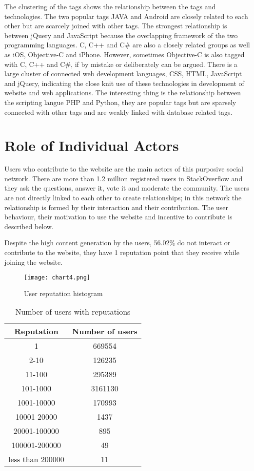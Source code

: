The clustering of the tags shows the relationship between the tags and technologies. The two popular tags JAVA and Android are closely related to each other but are scarcely joined with other tags. The strongest relationship is between jQuery and JavaScript because the overlapping framework of the two programming languages. C, C++ and C\# are also a closely related groups as well as iOS, Objective-C and iPhone. However, sometimes Objective-C is also tagged with C, C++ and C\#, if by mistake or deliberately can be argued.
There is a large cluster of connected web development languages, CSS, HTML, JavaScript and jQuery, indicating the close knit use of these technologies in development of website and web applications. The interesting thing is the relationship between the scripting langue PHP and Python, they are popular tags but are sparsely connected with other tags and are weakly linked with database related tags.


\section{Role of Individual Actors}

Users who contribute to the website are the main actors of this purposive social network. There are more than 1.2 million registered users in StackOverflow and they ask the questions, answer it, vote it and moderate the community. The users are not directly linked to each other to create relationships; in this network the relationship is formed by their interaction and their contribution. The user behaviour, their motivation to use the website and incentive to contribute is described below.

Despite the high content generation by the users, 56.02\% do not interact or contribute to the website, they have 1 reputation point that they receive while joining the website.

\begin{figure}[!htb]
  \centering
  \texttt{[image: chart4.png]}
  \caption{User reputation histogram}
  \label{Figure:figex4g}
\end{figure}

\begin{table}[!htb]
  \centering
  \begin{tabular}{cc}
  \toprule
  \textbf{Reputation} & \textbf{Number of users}\\  \midrule
  1 & 669554\\ \midrule
  2-10 & 126235\\ \midrule
  11-100 & 295389\\ \midrule
  101-1000 & 3161130\\  \midrule
  1001-10000 & 170993\\ \midrule
  10001-20000 & 1437\\ \midrule
  20001-100000 & 895\\ \midrule
  100001-200000 & 49\\ \midrule
  less than 200000 & 11\\
  \bottomrule
  \end{tabular}
  \caption{Number of users with reputations}
  \label{Table:tabex3}
\end{table}

